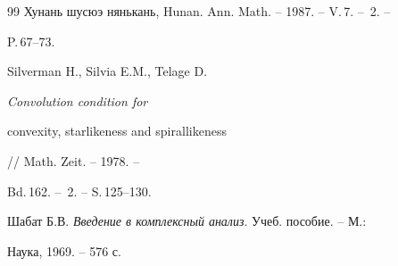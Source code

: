 \begin{thebibliography}{99}
Хунань шусюэ нянькань, Hunan. Ann. Math. -- 1987. -- V.\,7. -- \No\,2. -- 


P.\,67--73. 




Silverman H., Silvia E.M., Telage D. {\em Convolution condition for 


convexity, starlikeness and spirallikeness} // Math. Zeit. -- 1978. -- 


Bd.\,162. -- \No\,2. -- S.\,125--130. 




Шабат Б.В. {\em Введение в комплексный анализ}. Учеб. пособие. -- М.: 


Наука, 1969. -- 576 с. 


 


 


\end{thebibliography} 


 


\vskip 2cm 


 






 


\label{end} 


 


